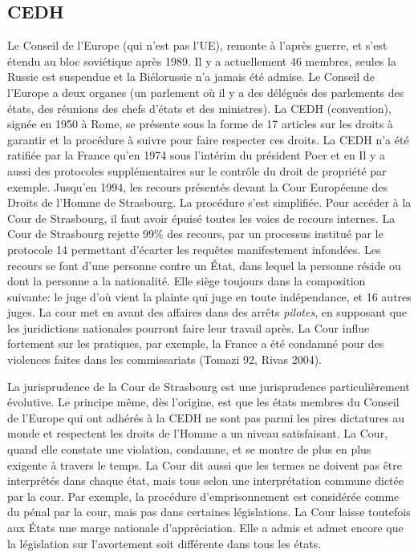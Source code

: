 \documentclass[math]{cours}
\begin{document}
\subsection{CEDH}
Le Conseil de l'Europe (qui n'est pas l'UE), remonte à l'après guerre, et s'est étendu au bloc soviétique après 1989.
Il y a actuellement 46 membres, seules la Russie est suspendue et la Biélorussie n'a jamais été admise.
Le Conseil de l'Europe a deux organes (un parlement où il y a des délégués des parlements des états, des réunions des chefs d'états et des ministres).
La CEDH (convention), signée en 1950 à Rome, se présente sous la forme de 17 articles sur les droits à garantir et la procédure à suivre pour faire respecter ces droits.
La CEDH n'a été ratifiée par la France qu'en 1974 sous l'intérim du président Poer et en
Il y a aussi des protocoles supplémentaires sur le contrôle du droit de propriété par exemple.
Jusqu'en 1994, les recours présentés devant la Cour Européenne des Droits de l'Homme de Strasbourg.
La procédure s'est simplifiée.
Pour accéder à la Cour de Strasbourg, il faut avoir épuisé toutes les voies de recours internes.
La Cour de Strasbourg rejette 99\% des recours, par un processus institué par le protocole 14 permettant d'écarter les requêtes manifestement infondées.
Les recours se font d'une personne contre un État, dans lequel la personne réside ou dont la personne a la nationalité.
Elle siège toujours dans la composition suivante: le juge d'où vient la plainte qui juge en toute indépendance, et 16 autres juges.
La cour met en avant des affaires dans des arrêts \textit{pilotes}, en supposant que les juridictions nationales pourront faire leur travail après.
La Cour influe fortement sur les pratiques, par exemple, la France a été condamné pour des violences faites dans les commissariats (Tomazi 92, Rivas 2004).

\smallskip

La jurisprudence de la Cour de Strasbourg est une jurisprudence particulièrement évolutive.
Le principe même, dès l'origine, est que les états membres du Conseil de l'Europe qui ont adhérés à la CEDH ne sont pas parmi les pires dictatures au monde et respectent les droits de l'Homme a un niveau satisfaisant.
La Cour, quand elle constate une violation, condamne, et se montre de plus en plus exigente à travers le temps.
La Cour dit aussi que les termes ne doivent pas être interprétés dans chaque état, mais tous selon une interprétation commune dictée par la cour.
Par exemple, la procédure d'emprisonnement est considérée comme du pénal par la cour, mais pas dans certaines législations.
La Cour laisse toutefois aux États une marge nationale d'appréciation. Elle a admis et admet encore que la législation sur l'avortement soit différente dans tous les états.
\end{document}
